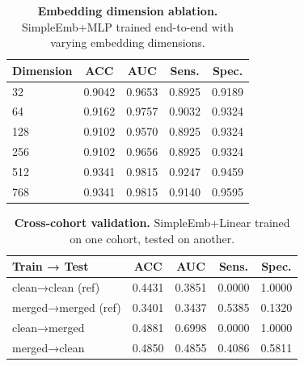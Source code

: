\begin{table}[t]
\centering
\caption{\textbf{Embedding dimension ablation.}
SimpleEmb+MLP trained end-to-end with varying embedding dimensions.}
\label{tab:embedding_dim}
\begin{tabular}{lcccc}
\toprule
\textbf{Dimension} & \textbf{ACC} & \textbf{AUC} & \textbf{Sens.} & \textbf{Spec.} \\
\midrule
  32 & 0.9042 & 0.9653 & 0.8925 & 0.9189 \\
  64 & 0.9162 & 0.9757 & 0.9032 & 0.9324 \\
  128 & 0.9102 & 0.9570 & 0.8925 & 0.9324 \\
  256 & 0.9102 & 0.9656 & 0.8925 & 0.9324 \\
  512 & 0.9341 & 0.9815 & 0.9247 & 0.9459 \\
  768 & 0.9341 & 0.9815 & 0.9140 & 0.9595 \\
\bottomrule
\end{tabular}
\end{table}
\begin{table}[t]
\centering
\caption{\textbf{Cross-cohort validation.}
SimpleEmb+Linear trained on one cohort, tested on another.}
\label{tab:cross_cohort}
\begin{tabular}{lcccc}
\toprule
\textbf{Train → Test} & \textbf{ACC} & \textbf{AUC} & \textbf{Sens.} & \textbf{Spec.} \\
\midrule
  clean→clean (ref) & 0.4431 & 0.3851 & 0.0000 & 1.0000 \\
  merged→merged (ref) & 0.3401 & 0.3437 & 0.5385 & 0.1320 \\
  clean→merged & 0.4881 & 0.6998 & 0.0000 & 1.0000 \\
  merged→clean & 0.4850 & 0.4855 & 0.4086 & 0.5811 \\
\bottomrule
\end{tabular}
\end{table}